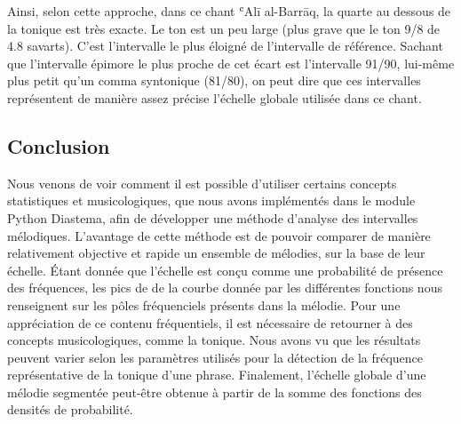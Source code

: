 \documentclass{article}
\begin{document}
    Ainsi, selon cette approche, dans ce chant ʿAlī al-Barrāq, la quarte au
dessous de la tonique est très exacte. Le ton est un peu large (plus
grave que le ton 9/8 de 4.8 savarts). C'est l'intervalle le plus éloigné
de l'intervalle de référence. Sachant que l'intervalle épimore le plus
proche de cet écart est l'intervalle 91/90, lui-même plus petit qu'un
comma syntonique (81/80), on peut dire que ces intervalles représentent
de manière assez précise l'échelle globale utilisée dans ce chant.

    \subsection*{Conclusion}\label{conclusion}

    Nous venons de voir comment il est possible d'utiliser certains concepts
statistiques et musicologiques, que nous avons implémentés dans le
module Python Diastema, afin de développer une méthode d'analyse des
intervalles mélodiques. L'avantage de cette méthode est de pouvoir
comparer de manière relativement objective et rapide un ensemble de
mélodies, sur la base de leur échelle. Étant donnée que l'échelle est
conçu comme une probabilité de présence des fréquences, les pics de de
la courbe donnée par les différentes fonctions nous renseignent sur les
pôles fréquenciels présents dans la mélodie. Pour une appréciation de ce
contenu fréquentiels, il est nécessaire de retourner à des concepts
musicologiques, comme la tonique. Nous avons vu que les résultats
peuvent varier selon les paramètres utilisés pour la détection de la
fréquence représentative de la tonique d'une phrase. Finalement,
l'échelle globale d'une mélodie segmentée peut-être obtenue à partir de
la somme des fonctions des densités de probabilité.


    
    
    
    
\end{document}
